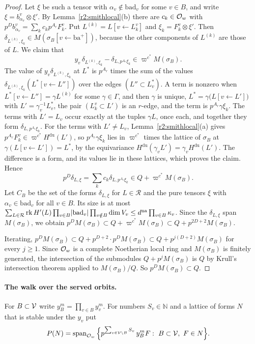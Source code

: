 \begin{proof}
Let $\xi$ be such a tensor with $\alpha_v\notin\mathrm{bad}_v$ for some $v\in B$, and write $\xi=b^v_{\alpha_v}\otimes\xi'$. By Lemma~\ref{r2:smithlocal}(b) there are $c_k\in\mathcal O_w$ with $p^Db^v_{\alpha_v}=\sum_kc_kp^{A_r}F^v_k$. Put $L^{(k)}=L[v\leftarrow L^v_k]$ and $\xi_k=F^v_k\otimes\xi'$. Then $\delta_{L^{(k)},\xi_k}\in M(\sigma_B[v\leftarrow\mathrm{ba}^+])$, because the other components of $L^{(k)}$ are those of $L$. We claim that
\[
y_v\,\delta_{L^{(k)},\xi_k}-\delta_{L,p^{A_r}\xi_k}\in\varpi^{c^*}M(\sigma_B).
\]
The value of $y_v\delta_{L^{(k)},\xi_k}$ at $L^*$ is $p^{A_r}$ times the sum of the values $\delta_{L^{(k)},\xi_k}(L^*[v\leftarrow L''])$ over the edges $(L''\subset L^*_v)$. A term is nonzero when $L^*[v\leftarrow L'']=\gamma L^{(k)}$ for some $\gamma\in\Gamma$, and then $\gamma$ is unique, $L^*=\gamma\big(L[v\leftarrow L']\big)$ with $L'=\gamma_v^{-1}L^*_v$, the pair $(L^v_k\subset L')$ is an $r$-edge, and the term is $p^{A_r}\gamma\xi_k$. The terms with $L'=L_v$ occur exactly at the tuples $\gamma L$, once each, and together they form $\delta_{L,p^{A_r}\xi_k}$. For the terms with $L'\ne L_v$, Lemma~\ref{r2:smithlocal}(a) gives $p^{A_r}F^v_k\in\varpi^{c^*}H^{\mathrm{du}}(L')$, so $p^{A_r}\gamma\xi_k$ lies in $\varpi^{c^*}$ times the lattice of $\sigma_B$ at $\gamma(L[v\leftarrow L'])=L^*$, by the equivariance $H^{\mathrm{du}}(\gamma_vL')=\gamma_vH^{\mathrm{du}}(L')$. The difference is a form, and its values lie in these lattices, which proves the claim. Hence
\[
p^D\delta_{L,\xi}=\sum_kc_k\delta_{L,p^{A_r}\xi_k}\in Q+\varpi^{c^*}M(\sigma_B).
\]
Let $C_B$ be the set of the forms $\delta_{L,\xi}$ for $L\in\mathcal R$ and the pure tensors $\xi$ with $\alpha_v\in\mathrm{bad}_v$ for all $v\in B$. Its size is at most $\sum_{L\in\mathcal R}\operatorname{rk} H'(L)\prod_{v\in B}\lvert\mathrm{bad}_v\rvert\prod_{v\notin B}\dim V_v\le d^{\mathrm{na}}\prod_{v\in B}\kappa_v$. Since the $\delta_{L,\xi}$ span $M(\sigma_B)$, we obtain $p^DM(\sigma_B)\subset Q+\varpi^{c^*}M(\sigma_B)\subset Q+p^{2D+2}M(\sigma_B)$.

Iterating, $p^DM(\sigma_B)\subset Q+p^{D+2}\cdot p^DM(\sigma_B)\subset Q+p^{j(D+2)}M(\sigma_B)$ for every $j\ge1$. Since $\mathcal O_w$ is a complete Noetherian local ring and $M(\sigma_B)$ is finitely generated, the intersection of the submodules $Q+p^jM(\sigma_B)$ is $Q$ by Krull's intersection theorem applied to $M(\sigma_B)/Q$. So $p^DM(\sigma_B)\subset Q$.
\end{proof}

\paragraph{The walk over the served orbits.} For $B\subset\mathcal V$ write $y_B^m=\prod_{v\in B}y_v^m$. For numbers $S_v\in\mathbb N$ and a lattice of forms $N$ that is stable under the $y_v$ put
\[
P(N)=\operatorname{span}_{\mathcal O_w}\Big\{p^{\sum_{v\in\mathcal V\setminus B}S_v}\,y_B^mF:\ B\subset\mathcal V,\ F\in N\Big\}.
\]

